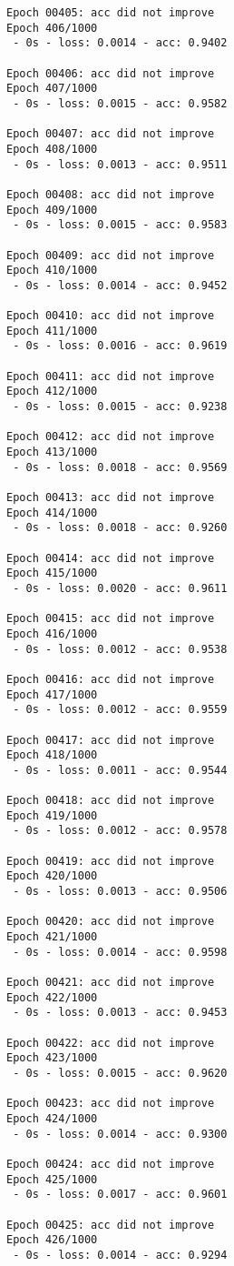 \documentclass[11pt]{article}
\begin{document}
\begin{Verbatim}[commandchars=\\\{\}]
Epoch 00405: acc did not improve
Epoch 406/1000
 - 0s - loss: 0.0014 - acc: 0.9402

Epoch 00406: acc did not improve
Epoch 407/1000
 - 0s - loss: 0.0015 - acc: 0.9582

Epoch 00407: acc did not improve
Epoch 408/1000
 - 0s - loss: 0.0013 - acc: 0.9511

Epoch 00408: acc did not improve
Epoch 409/1000
 - 0s - loss: 0.0015 - acc: 0.9583

Epoch 00409: acc did not improve
Epoch 410/1000
 - 0s - loss: 0.0014 - acc: 0.9452

Epoch 00410: acc did not improve
Epoch 411/1000
 - 0s - loss: 0.0016 - acc: 0.9619

Epoch 00411: acc did not improve
Epoch 412/1000
 - 0s - loss: 0.0015 - acc: 0.9238

Epoch 00412: acc did not improve
Epoch 413/1000
 - 0s - loss: 0.0018 - acc: 0.9569

Epoch 00413: acc did not improve
Epoch 414/1000
 - 0s - loss: 0.0018 - acc: 0.9260

Epoch 00414: acc did not improve
Epoch 415/1000
 - 0s - loss: 0.0020 - acc: 0.9611

Epoch 00415: acc did not improve
Epoch 416/1000
 - 0s - loss: 0.0012 - acc: 0.9538

Epoch 00416: acc did not improve
Epoch 417/1000
 - 0s - loss: 0.0012 - acc: 0.9559

Epoch 00417: acc did not improve
Epoch 418/1000
 - 0s - loss: 0.0011 - acc: 0.9544

Epoch 00418: acc did not improve
Epoch 419/1000
 - 0s - loss: 0.0012 - acc: 0.9578

Epoch 00419: acc did not improve
Epoch 420/1000
 - 0s - loss: 0.0013 - acc: 0.9506

Epoch 00420: acc did not improve
Epoch 421/1000
 - 0s - loss: 0.0014 - acc: 0.9598

Epoch 00421: acc did not improve
Epoch 422/1000
 - 0s - loss: 0.0013 - acc: 0.9453

Epoch 00422: acc did not improve
Epoch 423/1000
 - 0s - loss: 0.0015 - acc: 0.9620

Epoch 00423: acc did not improve
Epoch 424/1000
 - 0s - loss: 0.0014 - acc: 0.9300

Epoch 00424: acc did not improve
Epoch 425/1000
 - 0s - loss: 0.0017 - acc: 0.9601

Epoch 00425: acc did not improve
Epoch 426/1000
 - 0s - loss: 0.0014 - acc: 0.9294


\end{Verbatim}
\end{document}
